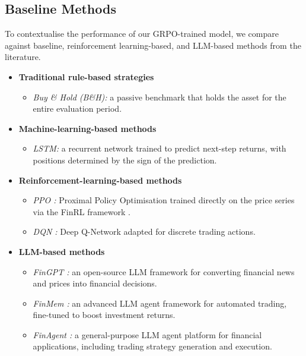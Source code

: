 \documentclass[conference]{IEEEtran}
\begin{document}
\subsection{Baseline Methods}
\label{sec:baselines}
To contextualise the performance of our GRPO-trained model, we compare against baseline, reinforcement learning-based, and LLM-based methods from the literature.
\begin{itemize}
  \item \textbf{Traditional rule-based strategies}
    \begin{itemize}
      \item \emph{Buy \& Hold (B\&H):} a passive benchmark that holds the asset for the entire
            evaluation period.
    \end{itemize}

  \item \textbf{Machine-learning-based methods}
    \begin{itemize}
      \item \emph{LSTM:} a recurrent network trained to predict next-step returns, with positions
            determined by the sign of the prediction.
    \end{itemize}

  \item \textbf{Reinforcement-learning-based methods}
    \begin{itemize}
      \item \emph{PPO \cite{schulman2017ppo}:} Proximal Policy Optimisation trained directly
            on the price series via the FinRL framework \cite{liu2021finrl}.
      \item \emph{DQN \cite{mnih2015human}:} Deep Q-Network adapted for discrete trading actions.
    \end{itemize}

  \item \textbf{LLM-based methods}
    \begin{itemize}
      \item \emph{FinGPT \cite{yang2023fingpt}:} an open-source LLM framework for converting
            financial news and prices into financial decisions.
      \item \emph{FinMem \cite{yu2023finmem}:} an advanced LLM agent framework for automated
            trading, fine-tuned to boost investment returns.
      \item \emph{FinAgent \cite{zhang2024finagent}:} a general-purpose LLM agent platform for
            financial applications, including trading strategy generation and execution.
    \end{itemize}
\end{itemize}
\end{document}
